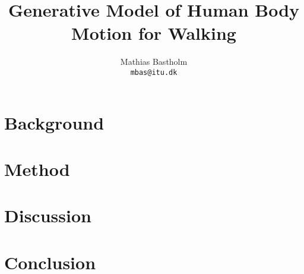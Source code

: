 \documentclass{article}
\title{Generative Model of Human Body Motion for Walking}
\author{%
    Mathias Bastholm\\
    \texttt{mbas@itu.dk}
}
\begin{document}

\pagebreak

\section{Background}\label{sec:background}


\section{Method}\label{sec:method}


\section{Discussion}\label{sec:discussion}


\section{Conclusion}\label{sec:conclusion}


\newpage
\printbibliography%
\end{document}

